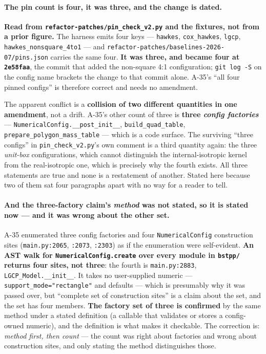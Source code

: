 \documentclass[
  10pt,
]{article}
\begin{document}
\paragraph{The pin count is four, it was three, and the change is dated.}
\textbf{Read from \texttt{refactor-patches/pin\_check\_v2.py} and the fixtures, not from a prior figure.} The harness emits four keys --- \texttt{hawkes}, \texttt{cox\_hawkes}, \texttt{lgcp}, \texttt{hawkes\_nonsquare\_4to1} --- and \texttt{refactor-patches/\allowbreak{}baselines-2026-07/\allowbreak{}pins.json} carries the same four. \textbf{It was three, and became four at \texttt{2e58faa}}, the commit that added the non-square 4:1 configuration; \texttt{git log -S} on the config name brackets the change to that commit alone. A-35's ``all four pinned configs'' is therefore correct and needs no amendment.

The apparent conflict is a \textbf{collision of two different quantities in one amendment}, not a drift. A-35's other count of three is \textbf{three \emph{config factories}} --- \texttt{NumericalConfig.\_\_post\_init\_\_}, \texttt{build\_quad\_table}, \texttt{prepare\_polygon\_mass\_table} --- which is a code surface. The surviving ``three configs'' in \texttt{pin\_check\_v2.py}'s own comment is a third quantity again: the three \emph{unit-box} configurations, which cannot distinguish the internal-isotropic kernel from the real-isotropic one, which is precisely why the fourth exists. All three statements are true and none is a restatement of another. Stated here because two of them sat four paragraphs apart with no way for a reader to tell.

\paragraph{And the three-factory claim's \emph{method} was not stated, so it is stated now --- and it was wrong about the other set.}
A-35 enumerated three config factories and four \texttt{NumericalConfig} construction sites (\texttt{main.py:2065}, \texttt{:2073}, \texttt{:2303}) as if the enumeration were self-evident. \textbf{An AST walk for \texttt{NumericalConfig.create} over every module in \texttt{bstpp/} returns four sites, not three}: the fourth is \texttt{main.py:2883}, \texttt{LGCP\_Model.\_\_init\_\_}. It takes no user-supplied numeric --- \texttt{support\_mode="rectangle"} and defaults --- which is presumably why it was passed over, but ``complete set of construction sites'' is a claim about the set, and the set has four members. \textbf{The factory set of three is confirmed} by the same method under a stated definition (a callable that validates or stores a config-owned numeric), and the definition is what makes it checkable. The correction is: \emph{method first, then count} --- the count was right about factories and wrong about construction sites, and only stating the method distinguishes those.
\end{document}

